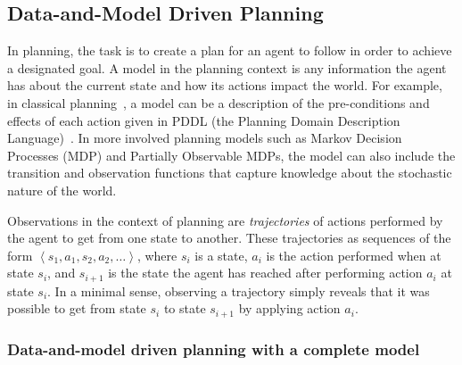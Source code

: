 \documentclass[12pt]{article}
\newcommand{\tuple}[1]{\ensuremath{\left \langle #1 \right \rangle }}
\begin{document}
\subsection{Data-and-Model Driven Planning}

In planning, the task is to create a plan for an agent to follow in order to achieve a designated goal. A model in the planning context is any information the agent has about the current state and how its actions impact the world. For example, in classical planning~\cite{fikes1971strips}, a model can be a description of the pre-conditions and effects of each action given in PDDL (the Planning Domain Description Language)~\cite{mcdermott1998pddl}. In more involved planning models such as Markov Decision Processes (MDP) and Partially Observable MDPs, the model can also include the transition and observation functions that capture knowledge about the stochastic nature of the world. 


Observations in the context of planning are {\em trajectories} of actions performed by the agent to get from one state to another. These trajectories as sequences of the form $\tuple{ s_1, a_1, s_2, a_2, \ldots}$, where $s_i$ is a state, $a_i$ is the action performed when at state $s_i$, and $s_{i+1}$ is the state the agent has reached after performing action $a_i$ at state $s_i$. In a minimal sense, observing a trajectory simply reveals that it was possible to get from state $s_i$ to state $s_{i+1}$ by applying action $a_i$. %


\subsubsection{Data-and-model driven planning with a complete model}
\end{document}
